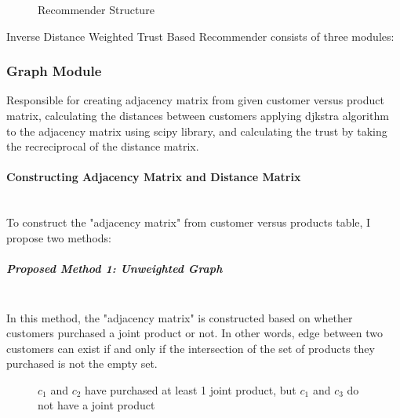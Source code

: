 	\begin{figure}[H]
		\centering
		\caption{Recommender Structure}
	\end{figure}
	Inverse Distance Weighted Trust Based Recommender consists of three modules:
	
	\subsubsection{Graph Module} Responsible for creating adjacency matrix from given customer versus product matrix, calculating the distances between customers applying djkstra algorithm to the adjacency matrix using scipy library, and calculating the trust by taking the recreciprocal of the distance matrix.
	\paragraph{Constructing Adjacency Matrix and Distance Matrix}\mbox{}\\
	To construct the "adjacency matrix" from customer versus products table, I propose two methods:
	\subparagraph{Proposed Method 1: Unweighted Graph}\mbox{}\\
	In this method, the "adjacency matrix" is constructed based on whether customers purchased a joint product or not. In other words, edge between two customers can exist if and only if the intersection of the set of products they purchased is not the empty set.
	\begin{figure}[H]
		\centering
		\caption{$c_{1}$ and $c_{2}$ have purchased at least 1 joint product, but $c_{1}$ and $c_{3}$ do not have a joint product}
	\end{figure}
	
